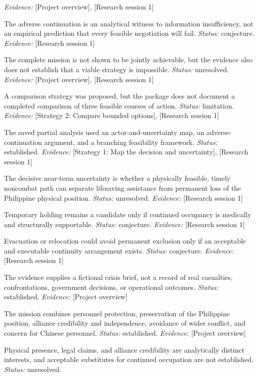\documentclass[11pt]{article}
\begin{document}
\begin{sloppypar}
\begin{description}
\textit{Evidence: }[Project overview], [Research session 1]
\item[C87] The adverse continuation is an analytical witness to information insufficiency, not an empirical prediction that every feasible negotiation will fail. \textit{Status: }conjecture.
\textit{Evidence: }[Research session 1]
\item[C86] The complete mission is not shown to be jointly achievable, but the evidence also does not establish that a viable strategy is impossible. \textit{Status: }unresolved.
\textit{Evidence: }[Project overview], [Research session 1]
\item[C85] A comparison strategy was proposed, but the package does not document a completed comparison of three feasible courses of action. \textit{Status: }limitation.
\textit{Evidence: }[Strategy 2: Compare bounded options], [Research session 1]
\item[C84] The saved partial analysis used an actor-and-uncertainty map, an adverse-continuation argument, and a branching feasibility framework. \textit{Status: }established.
\textit{Evidence: }[Strategy 1: Map the decision and uncertainty], [Research session 1]
\item[C83] The decisive near-term uncertainty is whether a physically feasible, timely noncombat path can separate lifesaving assistance from permanent loss of the Philippine physical position. \textit{Status: }unresolved.
\textit{Evidence: }[Research session 1]
\item[C82] Temporary holding remains a candidate only if continued occupancy is medically and structurally supportable. \textit{Status: }conjecture.
\textit{Evidence: }[Research session 1]
\item[C81] Evacuation or relocation could avoid permanent exclusion only if an acceptable and executable continuity arrangement exists. \textit{Status: }conjecture.
\textit{Evidence: }[Research session 1]
\item[C80] The evidence supplies a fictional crisis brief, not a record of real casualties, confrontations, government decisions, or operational outcomes. \textit{Status: }established.
\textit{Evidence: }[Project overview]
\item[C79] The mission combines personnel protection, preservation of the Philippine position, alliance credibility and independence, avoidance of wider conflict, and concern for Chinese personnel. \textit{Status: }established.
\textit{Evidence: }[Project overview]
\item[C78] Physical presence, legal claims, and alliance credibility are analytically distinct interests, and acceptable substitutes for continued occupation are not established. \textit{Status: }unresolved.

\end{description}
\end{sloppypar}
\end{document}
